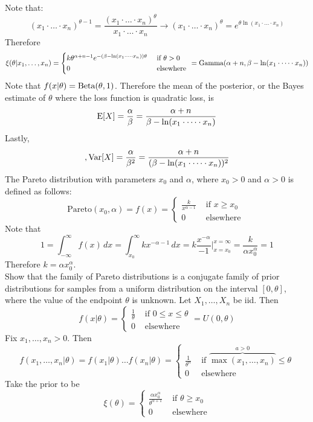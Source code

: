 \documentclass[12pt]{article}
\begin{document}
Note that: $$(x_1\cdot \dots \cdot x_n)^{\theta - 1} = \frac{(x_1 \cdot \dots \cdot x_n)^\theta}{x_1 \cdot \dots \cdot x_n} \to (x_1 \cdot \dots \cdot x_n)^\theta = e^{\theta \ln(x_1 \cdot \dots \cdot x_n)}$$ 
Therefore $$ \xi(\theta | x_1,\dots,x_n) = \begin{cases} k\theta^{\alpha + n - 1} e^{-(\beta - \ln(x_1 \cdot \dots \cdot x_n))\theta} &\text{ if } \theta > 0 \\ 0 &\text{ elsewhere } \end{cases}  = \text{Gamma}( \alpha + n, \beta - \ln(x_1\cdot \dots \cdot x_n) )$$ 
Note that $f(x|\theta) = \text{Beta}( \theta, 1 )$. Therefore the mean of the posterior, or the Bayes estimate of $\theta$ where the loss function is quadratic loss, is 
$$\mathrm{E}[ X ] = \frac{\alpha}{\beta} = \frac{\alpha + n}{\beta - \ln(x_1\cdot \dots \cdot x_n)} $$ 
Lastly, $$, \mathrm{Var}[ X ] = \frac{\alpha}{\beta^2} = \frac{\alpha + n}{(\beta - \ln(x_1 \cdot \dots \cdot x_n))^2} $$ 
The Pareto distribution with parameters $x_0$ and $\alpha$, where $x_0 > 0$ and $\alpha > 0$ is defined as follows: $$ \text{Pareto}(x_0,\alpha) = f(x) = \begin{cases} \frac{k}{x^{\alpha - 1}} &\text{ if } x \geq x_0 \\ 0 &\text{ elsewhere } \end{cases} $$ 
Note that $$ 1 = \int_{-\infty}^\infty f(x) \, dx = \int_{x_0}^\infty kx^{-\alpha - 1} \, dx = k\frac{x^{-\alpha}}{-1}\Big|_{x = x_0}^{x = \infty} = \frac{k}{\alpha x_0^\alpha} = 1 $$ 
Therefore $k = \alpha x_0^\alpha$. \\
Show that the family of Pareto distributions is a conjugate family of prior distributions for samples from a uniform distribution on the interval $[0,\theta]$, where the value of the endpoint $\theta$ is unknown. 
Let $X_1,\dots,X_n$ be iid. Then $$f(x|\theta) = \begin{cases} \frac{1}{\theta} &\text{ if } 0 \leq x \leq \theta \\ 0 &\text{ elsewhere }\end{cases} = U(0, \theta)$$ 
Fix $x_1,\dots,x_n > 0$. Then $$ f(x_1,\dots,x_n|\theta) = f(x_1|\theta)\dots f(x_n|\theta) = \begin{cases} \frac{1}{\theta^n} &\text{ if } \overbrace{\max(x_1,\dots,x_n)}^{a > 0} \leq \theta \\ 0 &\text{ elsewhere } \end{cases} $$ 
Take the prior to be $$ \xi(\theta) = \begin{cases} \frac{\alpha x_0^\alpha}{\theta^{\alpha + 1}} &\text{ if } \theta \geq x_0 \\ 0 &\text{ elsewhere} \end{cases} $$ 
\end{document}
